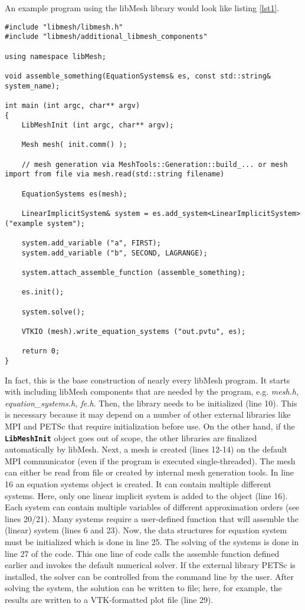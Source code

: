  An example program using the libMesh library would look like listing \ref{lst1}.
 \begin{lstlisting}[caption=Example libMesh program,label=lst1]
#include "libmesh/libmesh.h"
#include "libmesh/additional_libmesh_components"

using namespace libMesh;

void assemble_something(EquationSystems& es, const std::string& system_name);

int main (int argc, char** argv)
{
	LibMeshInit (int argc, char** argv);
	
	Mesh mesh( init.comm() );
	
	// mesh generation via MeshTools::Generation::build_... or mesh import from file via mesh.read(std::string filename)
	
	EquationSystems es(mesh);
	
	LinearImplicitSystem& system = es.add_system<LinearImplicitSystem> ("example system");
	
	system.add_variable ("a", FIRST);
	system.add_variable ("b", SECOND, LAGRANGE);
	
	system.attach_assemble_function (assemble_something);

	es.init();
	
	system.solve();
	
	VTKIO (mesh).write_equation_systems ("out.pvtu", es);
	
	return 0;
}
 \end{lstlisting}
 In fact, this is the base construction of nearly every libMesh program. It starts with including libMesh components that are needed by the program, e.g. \textit{mesh.h, equation\_systems.h, fe.h}. Then, the library needs to be initialized (line 10). This is necessary because it may depend on a number of other external libraries like MPI and PETSc that require initialization before use. On the other hand, if the \texttt{\textbf{LibMeshInit}} object goes out of scope, the other libraries are finalized automatically by libMesh. Next, a mesh is created (lines 12-14) on the default MPI communicator (even if the program is executed single-threaded). The mesh can either be read from file or created by internal mesh generation tools. In line 16 an equation systems object is created. It can contain multiple different systems. Here, only one linear implicit system is added to the object (line 16). Each system can contain multiple variables of different approximation orders (see lines 20/21). Many systems require a user-defined function that will assemble the (linear) system (lines 6 and 23). Now, the data structures for equation system must be initialized which is done in line 25. The solving of the systems is done in line 27 of the code. This one line of code calls the assemble function defined earlier and invokes the default numerical solver. If the external library PETSc is installed, the solver can be controlled from the command line by the user. After solving the system, the solution can be written to file; here, for example, the results are written to a VTK-formatted plot file (line 29).
 
